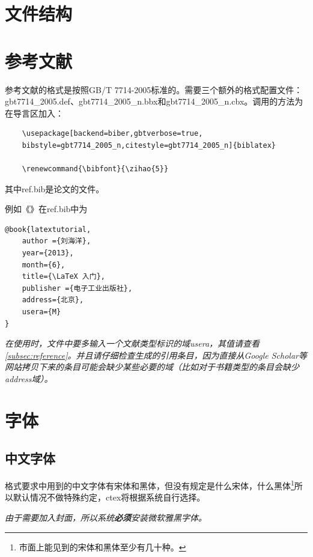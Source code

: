 \documentclass{LZU}
\renewcommand{\bibfont}{\zihao{5}}
\newenvironment{note}{\par\itshape\noindent{\makebox[-5pt][r]{\scriptsize\color{red!90}\textdbend\quad}}}{\par}
\newcommand{\filename}[1]{{\ttfamily #1}}
\newcommand{\package}[1]{{\sffamily #1}}
\begin{document}
\section{文件结构}
\section{参考文献}
参考文献的格式是按照GB/T 7714-2005标准的。需要三个额外的格式配置文件：\filename{gbt7714\_2005.def}、\filename{gbt7714\_2005\_n.bbx}和\filename{gbt7714\_2005\_n.cbx}。调用的方法为在导言区加入：
\begin{verbatim}
    \usepackage[backend=biber,gbtverbose=true,
    bibstyle=gbt7714_2005_n,citestyle=gbt7714_2005_n]{biblatex}
    
    \renewcommand{\bibfont}{\zihao{5}}
\end{verbatim}
其中\filename{ref.bib}是论文的文件。

例如《》\supercite{latextutorial}在\filename{ref.bib}中为
\begin{verbatim}
@book{latextutorial,
    author ={刘海洋},
    year={2013},
    month={6},
    title={\LaTeX 入门},
    publisher ={电子工业出版社},
    address={北京},
    usera={M}
}
\end{verbatim}
\begin{note}
    在使用时，文件中要多输入一个文献类型标识的域usera，其值请查看\cref{subsec:reference}。并且请仔细检查生成的引用条目，因为直接从Google Scholar等网站拷贝下来的条目可能会缺少某些必要的域（比如对于书籍类型的条目会缺少address域）。
\end{note}
\section{字体}
\subsection{中文字体}
格式要求中用到的中文字体有宋体和黑体，但没有规定是什么宋体，什么黑体\footnote{市面上能见到的宋体和黑体至少有几十种。}所以默认情况不做特殊约定，\package{ctex}将根据系统自行选择。
\begin{note}
    由于需要加入封面，所以系统{\bf 必须}安装微软雅黑字体。
\end{note}
\end{document}
